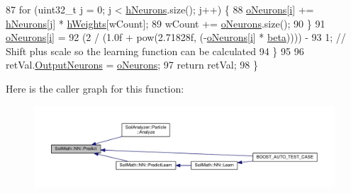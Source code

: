 \begin{DoxyCode}
87     \textcolor{keywordflow}{for} (uint32\_t \hyperlink{_comparision_pictures_2_createtest_image_8m_ac86694252f8dfdb19aaeadc4b7c342c6}{j} = 0; \hyperlink{_comparision_pictures_2_createtest_image_8m_ac86694252f8dfdb19aaeadc4b7c342c6}{j} < \hyperlink{class_soil_math_1_1_n_n_a459bde01ce33e0b27803cbe4a3b114b4}{hNeurons}.size(); \hyperlink{_comparision_pictures_2_createtest_image_8m_ac86694252f8dfdb19aaeadc4b7c342c6}{j}++) \{
88       \hyperlink{class_soil_math_1_1_n_n_a50a52b41982f6845dc5294f17607774b}{oNeurons}[\hyperlink{_comparision_pictures_2_createtest_image_8m_a6f6ccfcf58b31cb6412107d9d5281426}{i}] += \hyperlink{class_soil_math_1_1_n_n_a459bde01ce33e0b27803cbe4a3b114b4}{hNeurons}[\hyperlink{_comparision_pictures_2_createtest_image_8m_ac86694252f8dfdb19aaeadc4b7c342c6}{j}] * \hyperlink{class_soil_math_1_1_n_n_a46db1b2814215509a7345fccc8928efe}{hWeights}[wCount];
89       wCount += \hyperlink{class_soil_math_1_1_n_n_a50a52b41982f6845dc5294f17607774b}{oNeurons}.size();
90     \}
91     \hyperlink{class_soil_math_1_1_n_n_a50a52b41982f6845dc5294f17607774b}{oNeurons}[\hyperlink{_comparision_pictures_2_createtest_image_8m_a6f6ccfcf58b31cb6412107d9d5281426}{i}] =
92         (2 / (1.0f + pow(2.71828f, (-\hyperlink{class_soil_math_1_1_n_n_a50a52b41982f6845dc5294f17607774b}{oNeurons}[\hyperlink{_comparision_pictures_2_createtest_image_8m_a6f6ccfcf58b31cb6412107d9d5281426}{i}] * \hyperlink{class_soil_math_1_1_n_n_a4bb773955d78fa6f064b39a9149b78c8}{beta})))) -
93         1; \textcolor{comment}{// Shift plus scale so the learning function can be calculated}
94   \}
95 
96   retVal.\hyperlink{struct_predict__struct_aa0708cae93baa061f21452537e86d3bd}{OutputNeurons} = \hyperlink{class_soil_math_1_1_n_n_a50a52b41982f6845dc5294f17607774b}{oNeurons};
97   \textcolor{keywordflow}{return} retVal;
98 \}
\end{DoxyCode}


Here is the caller graph for this function\+:
\nopagebreak
\begin{figure}[H]
\begin{center}
\leavevmode
\includegraphics[width=350pt]{class_soil_math_1_1_n_n_aa7f23fcdb8383a74586c9c30b8bc0af7_icgraph}
\end{center}
\end{figure}


